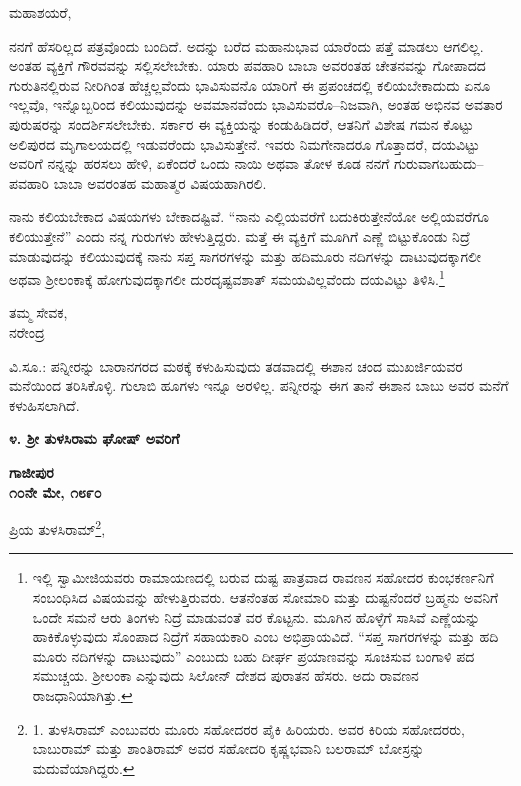 ಮಹಾಶಯರೆ,

ನನಗೆ ಹೆಸರಿಲ್ಲದ ಪತ್ರವೊಂದು ಬಂದಿದೆ. ಅದನ್ನು ಬರೆದ ಮಹಾನುಭಾವ ಯಾರೆಂದು ಪತ್ತೆ ಮಾಡಲು ಆಗಲಿಲ್ಲ. ಅಂತಹ ವ್ಯಕ್ತಿಗೆ ಗೌರವವನ್ನು ಸಲ್ಲಿಸಲೇಬೇಕು. ಯಾರು ಪವಹಾರಿ ಬಾಬಾ ಅವರಂತಹ ಚೇತನವನ್ನು ಗೋಪಾದದ ಗುರುತಿನಲ್ಲಿರುವ ನೀರಿಗಿಂತ ಹೆಚ್ಚಲ್ಲವೆಂದು ಭಾವಿಸುವನೊ ಯಾರಿಗೆ ಈ ಪ್ರಪಂಚದಲ್ಲಿ ಕಲಿಯಬೇಕಾದುದು ಏನೂ ಇಲ್ಲವೊ, ಇನ್ನೊಬ್ಬರಿಂದ ಕಲಿಯುವುದನ್ನು ಅವಮಾನವೆಂದು ಭಾವಿಸುವರೊ–ನಿಜವಾಗಿ, ಅಂತಹ ಅಭಿನವ ಅವತಾರ ಪುರುಷರನ್ನು ಸಂದರ್ಶಿಸಲೇಬೇಕು. ಸರ್ಕಾರ ಈ ವ್ಯಕ್ತಿಯನ್ನು ಕಂಡುಹಿಡಿದರೆ, ಆತನಿಗೆ ವಿಶೇಷ ಗಮನ ಕೊಟ್ಟು ಅಲಿಪುರದ ಮೃಗಾಲಯದಲ್ಲಿ ಇಡುವರೆಂದು ಭಾವಿಸುತ್ತೇನೆ. ಇವರು ನಿಮಗೇನಾದರೂ ಗೊತ್ತಾದರೆ, ದಯವಿಟ್ಟು ಅವರಿಗೆ ನನ್ನನ್ನು ಹರಸಲು ಹೇಳಿ, ಏಕೆಂದರೆ ಒಂದು ನಾಯಿ ಅಥವಾ ತೋಳ ಕೂಡ ನನಗೆ ಗುರುವಾಗಬಹುದು– ಪವಹಾರಿ ಬಾಬಾ ಅವರಂತಹ ಮಹಾತ್ಮರ ವಿಷಯಹಾಗಿರಲಿ.

ನಾನು ಕಲಿಯಬೇಕಾದ ವಿಷಯಗಳು ಬೇಕಾದಷ್ಟಿವೆ. “ನಾನು ಎಲ್ಲಿಯವರೆಗೆ ಬದುಕಿರುತ್ತೇನೆಯೋ ಅಲ್ಲಿಯವರೆಗೂ ಕಲಿಯುತ್ತೇನೆ” ಎಂದು ನನ್ನ ಗುರುಗಳು ಹೇಳುತ್ತಿದ್ದರು. ಮತ್ತೆ ಈ ವ್ಯಕ್ತಿಗೆ ಮೂಗಿಗೆ ಎಣ್ಣೆ ಬಿಟ್ಟುಕೊಂಡು ನಿದ್ರೆ ಮಾಡುವುದನ್ನು ಕಲಿಯುವುದಕ್ಕೆ ನಾನು ಸಪ್ತ ಸಾಗರಗಳನ್ನು ಮತ್ತು ಹದಿಮೂರು ನದಿಗಳನ್ನು ದಾಟುವುದಕ್ಕಾಗಲೀ ಅಥವಾ ಶ‍್ರೀಲಂಕಾಕ್ಕೆ ಹೋಗುವುದಕ್ಕಾಗಲೀ ದುರದೃಷ್ಟವಶಾತ್ ಸಮಯವಿಲ್ಲವೆಂದು ದಯವಿಟ್ಟು ತಿಳಿಸಿ.\footnote{ಇಲ್ಲಿ ಸ್ವಾಮೀಜಿಯವರು ರಾಮಾಯಣದಲ್ಲಿ ಬರುವ ದುಷ್ಟ ಪಾತ್ರವಾದ ರಾವಣನ ಸಹೋದರ ಕುಂಭಕರ್ಣನಿಗೆ ಸಂಬಂಧಿಸಿದ ವಿಷಯವನ್ನು ಹೇಳುತ್ತಿರುವರು. ಆತನೆಂತಹ ಸೋಮಾರಿ ಮತ್ತು ದುಷ್ಟನೆಂದರೆ ಬ್ರಹ್ಮನು ಅವನಿಗೆ ಒಂದೇ ಸಮನೆ ಆರು ತಿಂಗಳು ನಿದ್ರೆ ಮಾಡುವಂತೆ ವರ ಕೊಟ್ಟನು. ಮೂಗಿನ ಹೊಳ್ಳೆಗೆ ಸಾಸಿವೆ ಎಣ್ಣೆಯನ್ನು ಹಾಕಿಕೊಳ್ಳುವುದು ಸೊಂಪಾದ ನಿದ್ರೆಗೆ ಸಹಾಯಕಾರಿ ಎಂಬ ಅಭಿಪ್ರಾಯವಿದೆ. “ಸಪ್ತ ಸಾಗರಗಳನ್ನು ಮತ್ತು ಹದಿ ಮೂರು ನದಿಗಳನ್ನು ದಾಟುವುದು” ಎಂಬುದು ಬಹು ದೀರ್ಘ ಪ್ರಯಾಣವನ್ನು ಸೂಚಿಸುವ ಬಂಗಾಳಿ ಪದ ಸಮುಚ್ಚಯ. ಶ‍್ರೀಲಂಕಾ ಎನ್ನುವುದು ಸಿಲೋನ್ ದೇಶದ ಪುರಾತನ ಹೆಸರು. ಅದು ರಾವಣನ ರಾಜಧಾನಿಯಾಗಿತ್ತು.}

\begin{flushright}
ತಮ್ಮ ಸೇವಕ,\\ನರೇಂದ್ರ
\end{flushright}

{\small ವಿ.ಸೂ.: ಪನ್ನೀರನ್ನು ಬಾರಾನಗರದ ಮಠಕ್ಕೆ ಕಳುಹಿಸುವುದು ತಡವಾದಲ್ಲಿ ಈಶಾನ ಚಂದ ಮುಖರ್ಜಿಯವರ ಮನೆಯಿಂದ ತರಿಸಿಕೊಳ್ಳಿ. ಗುಲಾಬಿ ಹೂಗಳು ಇನ್ನೂ ಅರಳಿಲ್ಲ. ಪನ್ನೀರನ್ನು ಈಗ ತಾನೆ ಈಶಾನ ಬಾಬು ಅವರ ಮನೆಗೆ ಕಳುಹಿಸಲಾಗಿದೆ.}

\begin{center}
\textbf{೪. ಶ‍್ರೀ ತುಳಸಿರಾಮ ಘೋಷ್ ಅವರಿಗೆ}
\end{center}

\begin{flushright}
\textbf{ಗಾಜೀಪುರ\\೧೦ನೇ ಮೇ, ೧೮೯೦}
\end{flushright}

ಪ್ರಿಯ ತುಳಸಿರಾಮ್​\footnote{1. ತುಳಸಿರಾಮ್​ ಎಂಬುವರು ಮೂರು ಸಹೋದರರ ಪೈಕಿ ಹಿರಿಯರು. ಅವರ ಕಿರಿಯ ಸಹೋದರರು, ಬಾಬುರಾಮ್​ ಮತ್ತು ಶಾಂತಿರಾಮ್​ ಅವರ ಸಹೋದರಿ ಕೃಷ್ಣಭವಾನಿ ಬಲರಾಮ್​ ಬೋಸ್ರನ್ನು ಮದುವೆಯಾಗಿದ್ದರು.},

